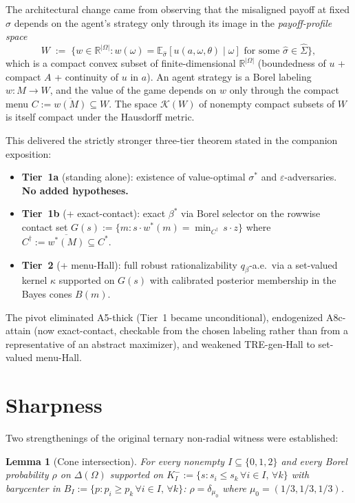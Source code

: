 \documentclass[11pt]{article}
\newtheorem{lemma}[theorem]{Lemma}
\theoremstyle{definition}
\theoremstyle{remark}
\newcommand{\R}{\mathbb{R}}
\newcommand{\eps}{\varepsilon}
\newcommand{\Om}{\Omega}
\newcommand{\Si}{\Sigma}
\newcommand{\E}{\mathbb{E}}
\begin{document}
The architectural change came from observing that the misaligned
payoff at fixed $\sigma$ depends on the agent's strategy only through
its image in the \emph{payoff-profile space}
\[
  W \;:=\; \{w\in\R^{|\Om|} : w(\omega) = \E_{\hat\sigma}[u(a,\omega,\theta)\mid\omega]\text{ for some }\hat\sigma\in\hat\Si\},
\]
which is a compact convex subset of finite-dimensional $\R^{|\Om|}$
(boundedness of $u$ + compact $A$ + continuity of $u$ in $a$). An
agent strategy is a Borel labeling $w: M\to W$, and the value of the
game depends on $w$ only through the compact menu $C := \overline{w(M)}\subseteq W$.
The space $\mathcal K(W)$ of nonempty compact subsets of $W$ is itself
compact under the Hausdorff metric.

This delivered the strictly stronger three-tier theorem stated in
the companion exposition:
\begin{itemize}[leftmargin=2em]
\item \textbf{Tier~1a} (standing alone): existence of value-optimal
$\sigma^*$ and $\eps$-adversaries. \textbf{No added hypotheses.}
\item \textbf{Tier~1b} (+ exact-contact): exact $\beta^*$ via Borel
selector on the rowwise contact set $G(s) := \{m : s\cdot w^*(m) =
\min_{C^\dagger}\,s\cdot z\}$ where $C^\dagger := \overline{w^*(M)}\subseteq C^*$.
\item \textbf{Tier~2} (+ menu-Hall): full robust rationalizability
$q_\beta$-a.e.\ via a set-valued kernel $\kappa$ supported on $G(s)$
with calibrated posterior membership in the Bayes cones $B(m)$.
\end{itemize}

The pivot eliminated A5-thick (Tier~1 became unconditional),
endogenized A8c-attain (now exact-contact, checkable from the chosen
labeling rather than from a representative of an abstract maximizer),
and weakened TRE-gen-Hall to set-valued menu-Hall.

\section{Sharpness}\label{sec:sharpness}

Two strengthenings of the original ternary non-radial witness were
established:

\begin{lemma}[Cone intersection]
For every nonempty $I\subseteq\{0,1,2\}$ and every Borel probability
$\rho$ on $\Delta(\Om)$ supported on $K_I^- := \{s : s_i\le s_k\,\forall i\in I,\,\forall k\}$
with barycenter in $B_I := \{p : p_i\ge p_k\,\forall i\in I,\,\forall k\}$:
$\rho = \delta_{\mu_0}$ where $\mu_0 = (1/3, 1/3, 1/3)$.
\end{lemma}
\end{document}
